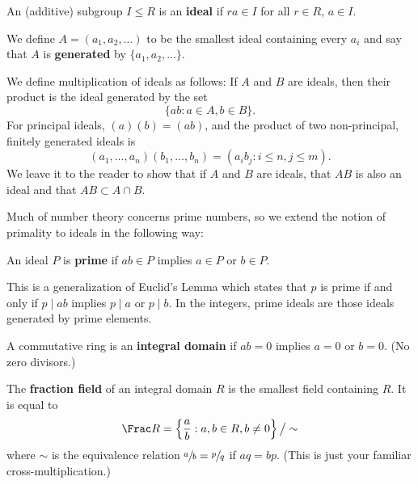 \begin{definition}[Ideal]
    An (additive) subgroup $I \leq R$ is an \textbf{ideal} if $ra \in I$ for all $r \in R$, $a \in I$.

    We define $A = (a_1, a_2, \ldots)$ to be the smallest ideal containing every $a_i$ and say that $A$ is \textbf{generated} by $\{a_1, a_2, \ldots \}$.
\end{definition}

We define multiplication of ideals as follows: If $A$ and $B$ are ideals, then their product is the ideal generated by the set
\begin{equation}
    \{ ab : a \in A, b \in B \}.
\end{equation}
For principal ideals, $(a) (b) = (ab)$, and the product of two non-principal, finitely generated ideals is
\begin{equation}
    (a_1, \ldots, a_n)(b_1, \ldots, b_n) = (a_i b_j : i \leq n, j \leq m).
\end{equation}
We leave it to the reader to show that if $A$ and $B$ are ideals, that $AB$ is also an ideal and that $AB \subset A \cap B$.

Much of number theory concerns prime numbers, so we extend the notion of primality to ideals in the following way:

\begin{definition}
    An ideal $P$ is \textbf{prime} if $ab \in P$ implies $a \in P$ or $b \in P$.
\end{definition}

This is a generalization of Euclid's Lemma which states that $p$ is prime if and only if $p \mid ab$ implies $p \mid a$ or $p \mid b$. In the integers, prime ideals are those ideals generated by prime elements.

\begin{definition}
    A commutative ring is an \textbf{integral domain} if $ab = 0$ implies $a = 0$ or $b = 0$. (No zero divisors.)
\end{definition}

\begin{definition}
    The \textbf{fraction field} of an integral domain $R$ is the smallest field containing $R$. It is equal to
    \begin{equation}
        \Frac R = \left\{ \frac a b : a, b \in R, b \neq 0 \right\} \big/ \sim
    \end{equation}
    where $\sim$ is the equivalence relation $\sfrac ab = \sfrac pq$ if $aq = bp$. (This is just your familiar cross-multiplication.)
\end{definition}

